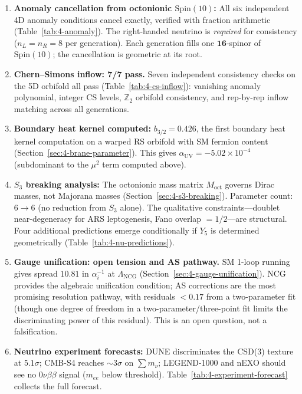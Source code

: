 \begin{enumerate}
  \item \textbf{Anomaly cancellation from octonionic $\mathrm{Spin}(10)$:} All six independent 4D anomaly conditions cancel exactly, verified with fraction arithmetic (Table~\ref{tab:4-anomaly}).  The right-handed neutrino is \emph{required} for consistency ($n_L = n_R = 8$ per generation).  Each generation fills one $\mathbf{16}$-spinor of $\mathrm{Spin}(10)$; the cancellation is geometric at its root.

  \item \textbf{Chern--Simons inflow: 7/7 pass.}  Seven independent consistency checks on the 5D orbifold all pass (Table~\ref{tab:4-cs-inflow}): vanishing anomaly polynomial, integer CS levels, $\mathbb{Z}_2$ orbifold consistency, and rep-by-rep inflow matching across all generations.

  \item \textbf{Boundary heat kernel computed:} $b_{3/2} = 0.426$, the first boundary heat kernel computation on a warped RS orbifold with SM fermion content (Section~\ref{sec:4-brane-parameter}).  This gives $\alpha_{\mathrm{UV}} = -5.02 \times 10^{-4}$ (subdominant to the $\mu^2$ term computed above).

  \item \textbf{$S_3$ breaking analysis:} The octonionic mass matrix $M_{\mathrm{oct}}$ governs Dirac masses, not Majorana masses (Section~\ref{sec:4-s3-breaking}).  Parameter count: $6 \to 6$ (no reduction from $S_3$ alone).  The qualitative constraints---doublet near-degeneracy for ARS leptogenesis, Fano overlap $= 1/2$---are structural.  Four additional predictions emerge conditionally if $Y_5$ is determined geometrically (Table~\ref{tab:4-nu-predictions}).

  \item \textbf{Gauge unification: open tension and AS pathway.}  SM 1-loop running gives spread $10.81$ in $\alpha_i^{-1}$ at $\Lambda_{\mathrm{NCG}}$ (Section~\ref{sec:4-gauge-unification}).  NCG provides the algebraic unification condition; AS corrections are the most promising resolution pathway, with residuals $< 0.17$ from a two-parameter fit (though one degree of freedom in a two-parameter/three-point fit limits the discriminating power of this residual).  This is an open question, not a falsification.

  \item \textbf{Neutrino experiment forecasts:} DUNE discriminates the CSD(3) texture at $5.1\sigma$; CMB-S4 reaches $\sim 3\sigma$ on $\sum m_\nu$; LEGEND-1000 and nEXO should see no $0\nu\beta\beta$ signal ($m_{ee}$ below threshold).  Table~\ref{tab:4-experiment-forecast} collects the full forecast.
\end{enumerate}


